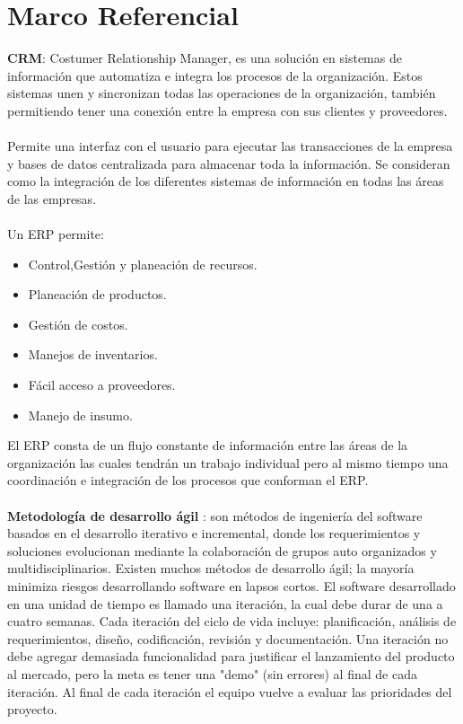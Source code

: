 \section{Marco Referencial}
%
\textbf{CRM}: Costumer Relationship Manager, es una soluci\'on en sistemas de informaci\'on que automatiza e integra  los procesos de la organizaci\'on. Estos sistemas unen y sincronizan todas las operaciones de la organizaci\'on, tambi\'en permitiendo tener una conexi\'on entre la empresa con sus clientes y proveedores.%
\\%
\\%
Permite una interfaz con el usuario para ejecutar las transacciones de la empresa y bases de datos centralizada para almacenar toda la informaci\'on. Se consideran como la integraci\'on de los diferentes sistemas de informaci\'on en todas las \'areas de las empresas.%
\\%
\\%
Un ERP permite:%
\\%
\begin{itemize}
	\item Control,Gesti\'on y planeaci\'on de recursos.
	\item Planeaci\'on de productos.
	\item Gesti\'on de costos.
	\item Manejos de inventarios.
	\item F\'acil acceso a proveedores.
	\item Manejo de insumo.
\end{itemize}
%
El ERP consta de un flujo constante de informaci\'on entre las \'areas de la organizaci\'on las cuales tendr\'an un trabajo individual pero al mismo tiempo una coordinaci\'on e integraci\'on de los procesos que conforman el ERP.%
\\%
\\%
\textbf{Metodolog\'ia de desarrollo \'agil }: son m\'etodos de ingenier\'ia del software basados en el desarrollo iterativo e incremental, donde los requerimientos y soluciones evolucionan mediante la colaboraci\'on de grupos auto organizados y multidisciplinarios. Existen muchos m\'etodos de desarrollo \'agil; la mayor\'ia minimiza riesgos desarrollando software en lapsos cortos. El software desarrollado en una unidad de tiempo es llamado una iteraci\'on, la cual debe durar de una a cuatro semanas. Cada iteraci\'on del ciclo de vida incluye: planificaci\'on, an\'alisis de requerimientos, dise\~no, codificaci\'on, revisi\'on y documentaci\'on. Una iteraci\'on no debe agregar demasiada funcionalidad para justificar el lanzamiento del producto al mercado, pero la meta es tener una "demo" (sin errores) al final de cada iteraci\'on. Al final de cada iteraci\'on el equipo vuelve a evaluar las prioridades del proyecto.%
